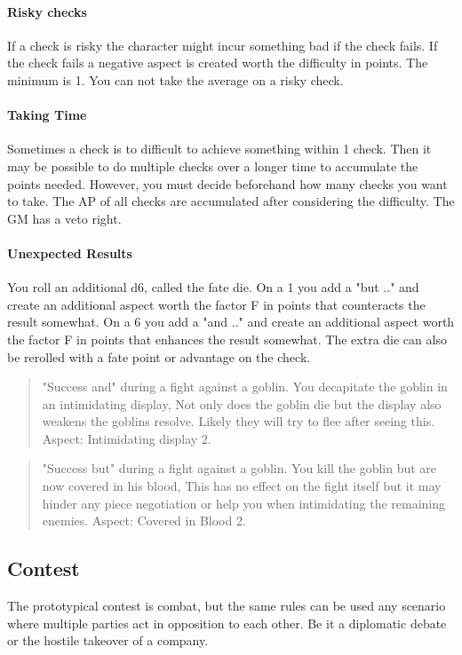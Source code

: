 \documentclass[11pt]{article}
\begin{document}
{\paragraph*{Risky checks}
\label{sec:org5ba67b3}
If a check is risky the character might incur something bad if the check fails. If the check fails a negative aspect is created worth the difficulty in points. The minimum is 1. You can not take the average on a risky check.

\paragraph*{Taking Time}
\label{sec:org792b732}
Sometimes a check is to difficult to achieve something within 1 check. Then it may be possible to do multiple checks over a longer time to accumulate the points needed. However, you must decide beforehand how many checks you want to take. The AP of all checks are accumulated after considering the difficulty. The GM has a veto right.

\paragraph*{Unexpected Results}
\label{sec:org42a116a}
You roll an additional d6, called the fate die. On a 1 you add a "but .." and create an additional aspect worth the factor F in points that counteracts the result somewhat. On a 6 you add a "and .." and create an additional aspect worth the factor F in points that enhances the result somewhat. The extra die can also be rerolled with a fate point or advantage on the check.

\begin{quote}
"Success and" during a fight against a goblin. You decapitate the goblin in an intimidating display, Not only does the goblin die but the display also weakens the goblins resolve. Likely they will try to flee after seeing this.
Aspect: Intimidating display 2.
\end{quote}

\begin{quote}
"Success but" during a fight against a goblin. You kill the goblin but are now covered in his blood, This has no effect on the fight itself but it may hinder any piece negotiation or help you when intimidating the remaining enemies.
Aspect: Covered in Blood 2.
\end{quote}

\subsection{Contest}
\label{sec:org1ed98bf}
The prototypical contest is combat, but the same rules can be used any scenario where multiple parties act in opposition to each other. Be it a diplomatic debate or the hostile takeover of a company. 

}
\end{document}
